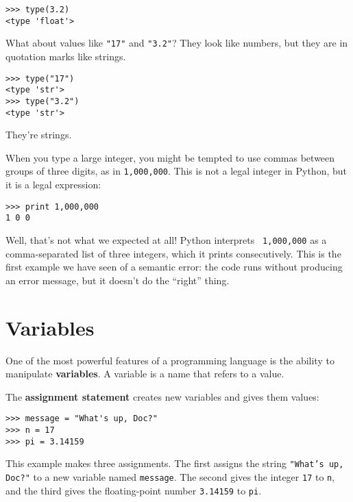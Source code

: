 
\beforeverb
\begin{verbatim}
>>> type(3.2)
<type 'float'>
\end{verbatim}
\afterverb
%
What about values like {\tt "17"} and {\tt "3.2"}?
They look like numbers, but they are in quotation marks like
strings.

\beforeverb
\begin{verbatim}
>>> type("17")
<type 'str'>
>>> type("3.2")
<type 'str'>
\end{verbatim}
\afterverb
%
They're strings.

When you type a large integer, you might be tempted to use commas
between groups of three digits, as in {\tt 1,000,000}.  This is not a
legal integer in Python, but it is a legal expression:

\beforeverb
\begin{verbatim}
>>> print 1,000,000
1 0 0
\end{verbatim}
\afterverb
%
Well, that's not what we expected at all!  Python interprets {\tt
1,000,000} as a comma-separated list of three integers, which it
prints consecutively.  This is the first example we have seen of a
semantic error: the code runs without producing an error message, but
it doesn't do the ``right'' thing.


\section{Variables}

One of the most powerful features of a programming language is the
ability to manipulate {\bf variables}.  A variable is a name that
refers to a value.

The {\bf assignment statement} creates new variables and gives
them values:

\beforeverb
\begin{verbatim}
>>> message = "What's up, Doc?"
>>> n = 17
>>> pi = 3.14159
\end{verbatim}
\afterverb
%
This example makes three assignments.  The first assigns the string
{\tt "What's up, Doc?"} to a new variable named {\tt message}.
The second gives the integer {\tt 17} to {\tt n}, and the third
gives the floating-point number {\tt 3.14159} to {\tt pi}.



